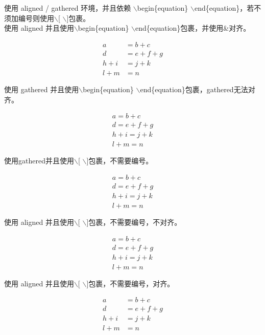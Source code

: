 \documentclass[UTF8]{ctexart}
\begin{document}
使用 aligned / gathered 环境，并且依赖 $\backslash$begin\{equation\} $\backslash$end\{equation\}，若不须加编号则使用$\backslash$[  $\backslash$]包裹。\\

使用 aligned 并且使用$\backslash$begin\{equation\} $\backslash$end\{equation\}包裹，并使用\&对齐。


\begin{equation}
\begin{aligned} 
a &= b + c \\
d &= e + f + g \\
h + i &= j + k \\
l + m &= n
\end{aligned}
\end{equation}


使用 gathered 并且使用$\backslash$begin\{equation\} $\backslash$end\{equation\}包裹，gathered无法对齐。

\begin{equation}
\begin{gathered} 
a = b + c \\
d = e + f + g \\
h + i = j + k \\
l + m = n
\end{gathered}
\end{equation}

使用gathered并且使用$\backslash$[  $\backslash$]包裹，不需要编号。

\[
\begin{gathered}
a = b + c \\
d = e + f + g \\
h + i = j + k \\
l + m = n
\end{gathered}
\]

使用 aligned 并且使用$\backslash$[  $\backslash$]包裹，不需要编号，不对齐。

\[
\begin{aligned}
a = b + c \\
d = e + f + g \\
h + i = j + k \\
l + m = n
\end{aligned}
\]


使用 aligned 并且使用$\backslash$[  $\backslash$]包裹，不需要编号，对齐。

\[
\begin{aligned}
a &= b + c \\
d &= e + f + g \\
h + i &= j + k \\
l + m &= n
\end{aligned}
\]
\end{document}
